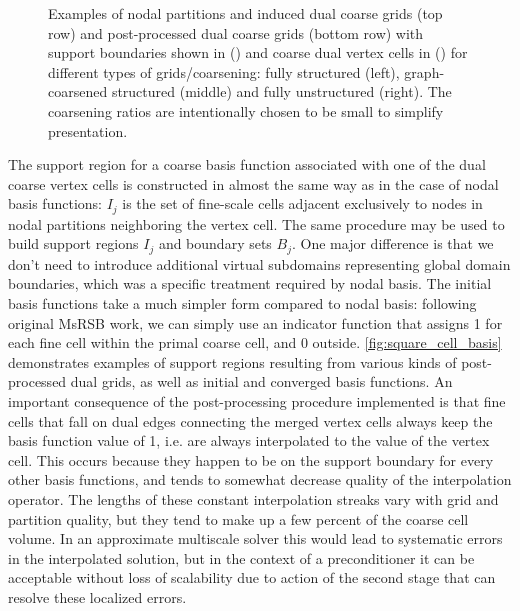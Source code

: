 \begin{figure}[htbp]
\begin{subfigure}[t]{0.3\textwidth}
  \end{subfigure}
  \caption[Dual grid for cell-centered basis functions]{\label{fig:square_cell_dual} Examples of nodal partitions and induced dual coarse grids (top row) and post-processed dual coarse grids (bottom row) with support boundaries shown in () and coarse dual vertex cells in () for different types of grids/coarsening: fully structured (left), graph-coarsened structured (middle) and fully unstructured (right).   The coarsening ratios are intentionally chosen to be small to simplify presentation.}
\end{figure}

The support region for a coarse basis function associated with one of the dual coarse vertex cells is constructed in almost the same way as in the case of nodal basis functions: $I_j$ is the set of fine-scale cells adjacent exclusively to nodes in nodal partitions neighboring the vertex cell.   The same procedure may be used to build support regions $I_j$ and boundary sets $B_j$.   One major difference is that we don't need to introduce additional virtual subdomains representing global domain boundaries, which was a specific treatment required by nodal basis.   The initial basis functions take a much simpler form compared to nodal basis: following original MsRSB work, we can simply use an indicator function that assigns 1 for each fine cell within the primal coarse cell, and 0 outside.  \autoref{fig:square_cell_basis} demonstrates examples of support regions resulting from various kinds of post-processed dual grids, as well as initial and converged basis functions.   An important consequence of the post-processing procedure implemented is that fine cells that fall on dual edges connecting the merged vertex cells always keep the basis function value of 1, i.e. are always interpolated to the value of the vertex cell.   This occurs because they happen to be on the support boundary for every other basis functions, and tends to somewhat decrease quality of the interpolation operator.   The lengths of these constant interpolation streaks vary with grid and partition quality, but they tend to make up a few percent of the coarse cell volume.   In an approximate multiscale solver this would lead to systematic errors in the interpolated solution, but in the context of a preconditioner it can be acceptable without loss of scalability due to action of the second stage that can resolve these localized errors.

